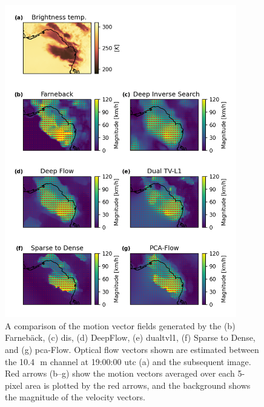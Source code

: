 \begin{figure}[t]
    \centering
    \includegraphics[width=0.9\textwidth]{figures/chapter1_10.png}
    \caption[
    A comparison of the motion vector fields generated by different optical flow methods
    ]{
    A comparison of the motion vector fields generated by the (b) Farnebäck, (c) \acrshort{dis}, (d) DeepFlow, (e) \acrshort{dualtvl1}, (f) Sparse to Dense, and (g) \acrshort{pca}-Flow. Optical flow vectors shown are estimated between the 10.4\,\unit{\mu m} channel at 19:00:00 \acrshort{utc} (a) and the subsequent image. Red arrows (b--g) show the motion vectors averaged over each 5-pixel area is plotted by the red arrows, and the background shows the magnitude of the velocity vectors.
    }
    \label{fig:opt_flow_comparison}
\end{figure}

